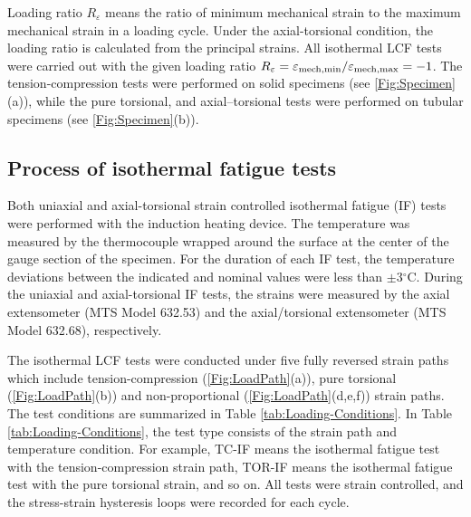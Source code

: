 Loading ratio $R_\varepsilon$ means the ratio of minimum mechanical strain to the maximum mechanical strain in a loading cycle. Under the axial-torsional condition, the loading ratio is calculated from the principal strains.
All isothermal LCF tests were carried out with the given loading ratio $R_{\varepsilon}=\varepsilon_{{\rm{mech}},\min}/\varepsilon_{{\rm{mech}},\max}=-1$.
The tension-compression tests were performed on solid specimens (see \ref{Fig:Specimen}(a)), while the pure torsional, and axial–torsional tests were performed on tubular specimens (see \ref{Fig:Specimen}(b)).

\subsection{Process of isothermal fatigue tests}
\noindent
Both uniaxial and axial-torsional strain controlled isothermal fatigue (IF) tests were performed with the induction heating device.
The temperature was measured by the thermocouple wrapped around the surface at the center of the gauge section of the specimen.
For the duration of each IF test, the temperature deviations between the indicated and nominal values were less than $\pm$3$^\circ$C.
During the uniaxial and axial-torsional IF tests, the strains were measured by the axial extensometer (MTS Model 632.53) and the axial/torsional extensometer (MTS Model 632.68), respectively.


The isothermal LCF tests were conducted under five fully reversed strain paths which include tension-compression (\ref{Fig:LoadPath}(a)), pure torsional (\ref{Fig:LoadPath}(b)) and non-proportional (\ref{Fig:LoadPath}(d,e,f)) strain paths.
The test conditions are summarized in Table \ref{tab:Loading-Conditions}.
In Table \ref{tab:Loading-Conditions}, the test type consists of the strain path and temperature condition. For example, TC-IF means the isothermal fatigue test with the tension-compression strain path, TOR-IF means the isothermal fatigue test with the pure torsional strain, and so on.
All tests were strain controlled, and the stress-strain hysteresis loops were recorded for each cycle.

